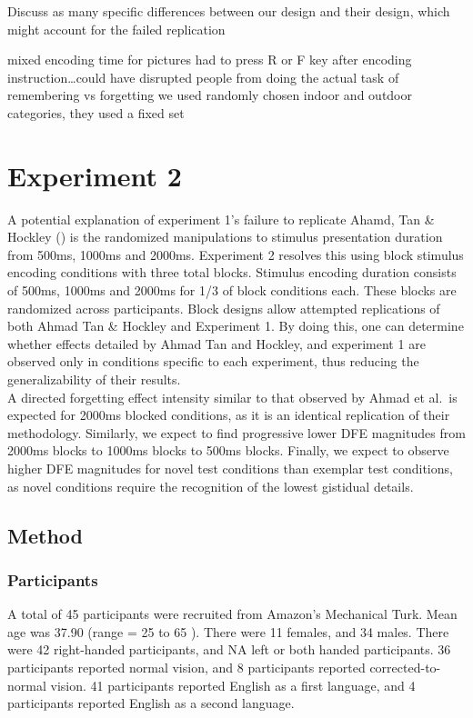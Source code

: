 \documentclass[
  man,floatsintext]{apa6}
\begin{document}
Discuss as many specific differences between our design and their design, which might account for the failed replication

mixed encoding time for pictures
had to press R or F key after encoding instruction\ldots could have disrupted people from doing the actual task of remembering vs forgetting
we used randomly chosen indoor and outdoor categories, they used a fixed set

\hypertarget{experiment-2}{%
\section{Experiment 2}\label{experiment-2}}

A potential explanation of experiment 1's failure to replicate Ahamd, Tan \& Hockley () is the randomized manipulations to stimulus presentation duration from 500ms, 1000ms and 2000ms. Experiment 2 resolves this using block stimulus encoding conditions with three total blocks. Stimulus encoding duration consists of 500ms, 1000ms and 2000ms for 1/3 of block conditions each. These blocks are randomized across participants. Block designs allow attempted replications of both Ahmad Tan \& Hockley and Experiment 1. By doing this, one can determine whether effects detailed by Ahmad Tan and Hockley, and experiment 1 are observed only in conditions specific to each experiment, thus reducing the generalizability of their results.\\
A directed forgetting effect intensity similar to that observed by Ahmad et al.~is expected for 2000ms blocked conditions, as it is an identical replication of their methodology. Similarly, we expect to find progressive lower DFE magnitudes from 2000ms blocks to 1000ms blocks to 500ms blocks. Finally, we expect to observe higher DFE magnitudes for novel test conditions than exemplar test conditions, as novel conditions require the recognition of the lowest gistidual details.

\hypertarget{method-1}{%
\subsection{Method}\label{method-1}}

\hypertarget{participants-1}{%
\subsubsection{Participants}\label{participants-1}}

A total of 45 participants were recruited from Amazon's Mechanical Turk. Mean age was 37.90 (range = 25 to 65 ). There were 11 females, and 34 males. There were 42 right-handed participants, and NA left or both handed participants. 36 participants reported normal vision, and 8 participants reported corrected-to-normal vision. 41 participants reported English as a first language, and 4 participants reported English as a second language.
\end{document}
